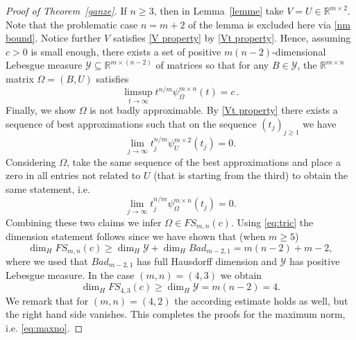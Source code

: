 \documentclass[10pt]{amsart}
\theoremstyle{definition}
\newcommand{\R}{\mathbb{R}}
\begin{document}
\begin{proof}[Proof of Theorem~\ref{ganze}]
    If $n\geq 3$, then in Lemma~\ref{lemme} take $V=U\in \R^{m\times2}$. 
    Note that the problematic
    case $n=m+2$ of the lemma is excluded
    here via \eqref{nm bound}.
    Notice further $V$ satisfies \eqref{V property} by \eqref{Vt property}. Hence, assuming $c>0$ is small enough, there exists a set of positive $m(n-2)$-dimensional Lebesgue measure $\mathcal{Y}\subseteq \R^{m\times(n-2)}$ of matrices so that for any $B\in\mathcal{Y}$, the $\R^{m\times n}$ matrix $\Omega=(B,U)$ satisfies
    \begin{equation*}
        \limsup_{t\to\infty}t^{n/m}\psi_{\Omega}^{m\times n}(t)=c\, .
    \end{equation*}
    Finally, we show $\Omega$ is not badly approximable.
    By \eqref{Vt property} there exists a sequence of best approximations such that on the sequence $(t_{j})_{j\geq 1}$ we have
    \begin{equation*}
        \lim_{j\to \infty} t_{j}^{n/m}\psi_{U}^{m\times 2}(t_{j})=0.
    \end{equation*}
    Considering $\Omega$, take the same sequence of the best approximations and place a zero in all entries not related to $U$ (that is starting from the third) to obtain the same statement, i.e.
    \begin{equation*}
        \lim_{j\to \infty} t_{j}^{n/m}\psi_{\Omega}^{m\times n}(t_{j})=0.
    \end{equation*}
    Combining these two claims we infer $\Omega \in FS_{m,n}(c)$. Using \eqref{eq:tric} the dimension statement follows since we have shown that (when $m\geq 5$)
    \begin{equation*}
        \dim_H FS_{m,n}(c) \geq \dim_H \mathcal{Y} + \dim_H Bad_{m-2,1} = m(n-2) + m-2, 
    \end{equation*}
   where we used that $Bad_{m-2,1}$ has full Hausdorff dimension and $\mathcal{Y}$ has positive Lebesgue measure. In the case $(m,n)=(4,3)$ we obtain
    \begin{equation*}
        \dim_H FS_{4,3}(c) \geq \dim_H \mathcal{Y} = m(n-2)=4. 
    \end{equation*}
    We remark that for $(m,n)=(4,2)$ the according estimate holds as well, but the right hand side vanishes. This completes the proofs for the maximum norm, i.e. \eqref{eq:maxno}.
    



\end{proof}
\end{document}
